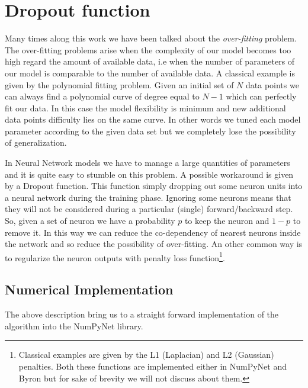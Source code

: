 \documentclass{standalone}
\begin{document}
\section[Dropout function]{Dropout function}\label{dropout}

Many times along this work we have been talked about the \emph{over-fitting} problem.
The over-fitting problems arise when the complexity of our model becomes too high regard the amount of available data, i.e when the number of parameters of our model is comparable to the number of available data.
A classical example is given by the polynomial fitting problem.
Given an initial set of $N$ data points we can always find a polynomial curve of degree equal to $N-1$ which can perfectly fit our data.
In this case the model flexibility is minimum and new additional data points difficulty lies on the same curve.
In other words we tuned each model parameter according to the given data set but we completely lose the possibility of generalization.

In Neural Network models we have to manage a large quantities of parameters and it is quite easy to stumble on this problem.
A possible workaround is given by a Dropout function.
This function simply dropping out some neuron units into a neural network during the training phase.
Ignoring some neurons means that they will not be considered during a particular (single) forward/backward step.
So, given a set of neuron we have a probability $p$ to keep the neuron and $1-p$ to remove it.
In this way we can reduce the co-dependency of nearest neurons inside the network and so reduce the possibility of over-fitting.
An other common way is to regularize the neuron outputs with penalty loss function\footnote{
  Classical examples are given by the L1 (Laplacian) and L2 (Gaussian) penalties.
  Both these functions are implemented either in NumPyNet and Byron but for sake of brevity we will not discuss about them.
}.



\subsection[Numerical Implementation]{Numerical Implementation}\label{drop_num}

The above description bring us to a straight forward implementation of the algorithm into the NumPyNet library.
\end{document}

